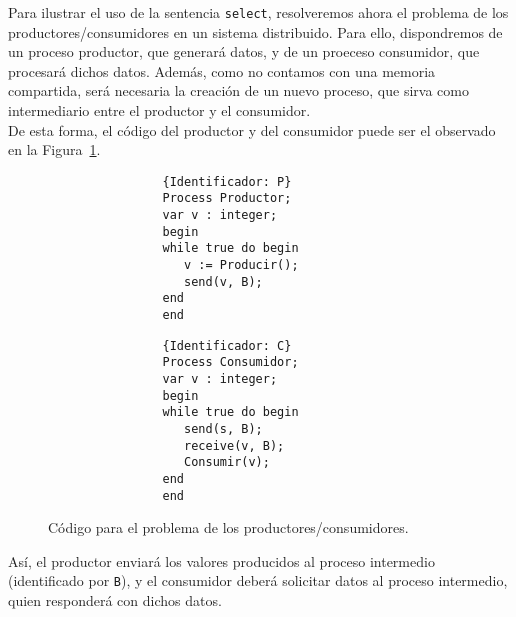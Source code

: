 \begin{ejemplo}
    Para ilustrar el uso de la sentencia \verb|select|, resolveremos ahora el problema de los productores/consumidores en un sistema distribuido. Para ello, dispondremos de un proceso productor, que generará datos, y de un proeceso consumidor, que procesará dichos datos. Además, como no contamos con una memoria compartida, será necesaria la creación de un nuevo proceso, que sirva como intermediario entre el productor y el consumidor.\\

    De esta forma, el código del productor y del consumidor puede ser el observado en la Figura~\ref{fig:prod_cons}.
    \begin{figure}[H]
        \centering
        \setlength{\columnsep}{1cm}
        \begin{multicols}{2}
            \begin{verbatim}
                {Identificador: P}
                Process Productor;
                var v : integer;
                begin
                while true do begin
                   v := Producir();
                   send(v, B);
                end
                end
            \end{verbatim}
            \begin{verbatim}
                {Identificador: C}
                Process Consumidor;
                var v : integer;
                begin
                while true do begin
                   send(s, B);
                   receive(v, B);
                   Consumir(v);
                end
                end
            \end{verbatim}
        \end{multicols}
        \caption{Código para el problema de los productores/consumidores.}
        \label{fig:prod_cons}
    \end{figure}
    Así, el productor enviará los valores producidos al proceso intermedio (identificado por \verb|B|), y el consumidor deberá solicitar datos al proceso intermedio, quien responderá con dichos datos.\\


\end{ejemplo}
